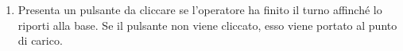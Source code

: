 \begin{itemize}
{\begin{enumerate}
\begin{enumerate}
\begin{itemize}
\begin{itemize}
\begin{itemize}
{						ricalcolo del percorso a partire dalla mossa attuale\\}									\end{itemize}
				\end{itemize}				
				\item{attende la conferma dell'operatore che dichiara di aver eseguito lo scarico\\}
			\end{itemize}						
			\item{passa alla \gls{task}\textsubscript{G} successiva\\}				
		\end{enumerate}
		\item{Presenta un pulsante da cliccare se l'operatore ha finito il turno affinché lo riporti alla base. Se il pulsante non viene cliccato, esso viene portato al punto di carico. \\}
	\end{enumerate}
	}
\end{itemize}
